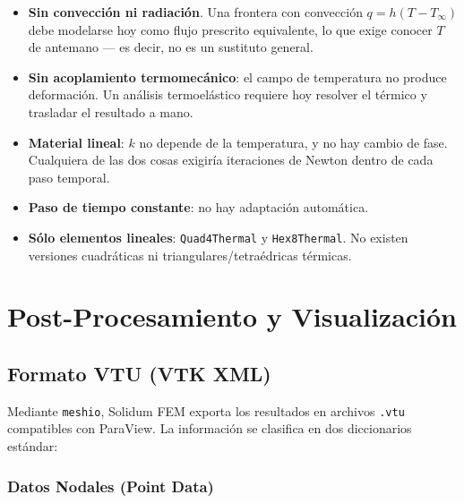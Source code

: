 \documentclass[11pt,oneside]{report}
\begin{document}
\begin{itemize}
  \item \textbf{Sin convección ni radiación}. Una frontera con convección $q = h(T - T_\infty)$ debe modelarse hoy como flujo prescrito equivalente, lo que exige conocer $T$ de antemano --- es decir, no es un sustituto general.
  \item \textbf{Sin acoplamiento termomecánico}: el campo de temperatura no produce deformación. Un análisis termoelástico requiere hoy resolver el térmico y trasladar el resultado a mano.
  \item \textbf{Material lineal}: $k$ no depende de la temperatura, y no hay cambio de fase. Cualquiera de las dos cosas exigiría iteraciones de Newton dentro de cada paso temporal.
  \item \textbf{Paso de tiempo constante}: no hay adaptación automática.
  \item \textbf{Sólo elementos lineales}: \texttt{Quad4Thermal} y \texttt{Hex8Thermal}. No existen versiones cuadráticas ni triangulares/tetraédricas térmicas.
\end{itemize}


\newpage

\chapter{Post-Procesamiento y Visualización}
\label{cap:9}



\section{Formato VTU (VTK XML)}

Mediante \texttt{meshio}, Solidum FEM exporta los resultados en archivos \texttt{.vtu} compatibles con ParaView. La información se clasifica en dos diccionarios estándar:

\subsection{Datos Nodales (Point Data)}
\end{document}
